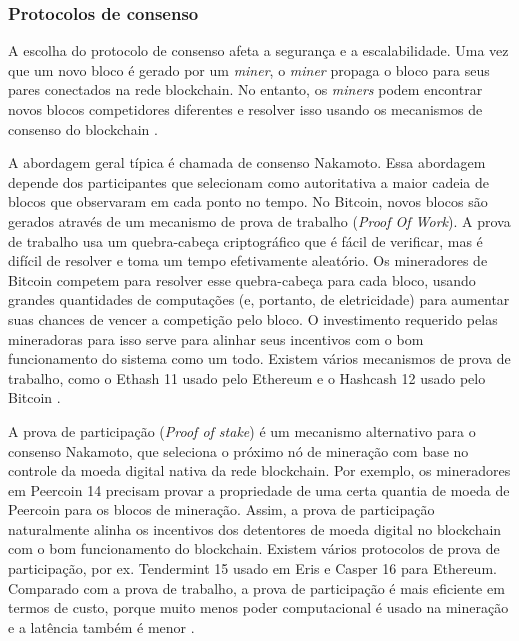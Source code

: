         
        \subsubsection{Protocolos de consenso}

            A escolha do protocolo de consenso afeta a segurança e a escalabilidade. Uma vez que um novo bloco é gerado por um \textit{miner}, o \textit{miner} propaga o bloco para seus pares conectados na rede blockchain. No entanto, os \textit{miners} podem encontrar novos blocos competidores diferentes e resolver isso usando os mecanismos de consenso do blockchain \cite{architecture_for_blockchain}.
            
            A abordagem geral típica é chamada de consenso Nakamoto. Essa abordagem depende dos participantes que selecionam como autoritativa a maior cadeia de blocos que observaram em cada ponto no tempo. No Bitcoin, novos blocos são gerados através de um mecanismo de prova de trabalho (\textit{Proof Of Work}). A prova de trabalho usa um quebra-cabeça criptográfico que é fácil de verificar, mas é difícil de resolver e toma um tempo efetivamente aleatório. Os mineradores de Bitcoin competem para resolver esse quebra-cabeça para cada bloco, usando grandes quantidades de computações (e, portanto, de eletricidade) para aumentar suas chances de vencer a competição pelo bloco. O investimento requerido pelas mineradoras para isso serve para alinhar seus incentivos com o bom funcionamento do sistema como um todo. Existem vários mecanismos de prova de trabalho, como o Ethash 11 usado pelo Ethereum e o Hashcash 12 usado pelo Bitcoin \cite{architecture_for_blockchain}.
            
            A prova de participação (\textit{Proof of stake}) é um mecanismo alternativo para o consenso Nakamoto, que seleciona o próximo nó de mineração com base no controle da moeda digital nativa da rede blockchain. Por exemplo, os mineradores em Peercoin 14 precisam provar a propriedade de uma certa quantia de moeda de Peercoin para os blocos de mineração. Assim, a prova de participação naturalmente alinha os incentivos dos detentores de moeda digital no blockchain com o bom funcionamento do blockchain. Existem vários protocolos de prova de participação, por ex. Tendermint 15 usado em Eris e Casper 16 para Ethereum. Comparado com a prova de trabalho, a prova de participação é mais eficiente em termos de custo, porque muito menos poder computacional é usado na mineração e a latência também é menor \cite{architecture_for_blockchain}.
            
